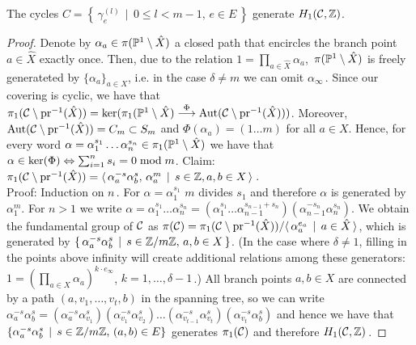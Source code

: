 \documentclass[main.tex]{subfiles}
\begin{document}
  \begin{thm}\label{thm:gen_set}
   The cycles $C = \left\{ \, \gamma_{e}^{(l)} \, \mid \, 0 \le l <m-1, \, e \in E \, \right\}$ generate $\homo$.
  \end{thm}
  \begin{proof}
  Denote by $\alpha_a \in \pi(\P^1 \setminus \hat{X})$ a closed path that encircles the branch point $a \in \hat{X}$ exactly once. Then,  due to the relation $1 = \prod_{a \in \hat{X}} \alpha_a$,\,
  $\pi(\P^1 \setminus \hat{X})$ is freely generateted by $\{ \alpha_a \}_{a \in X}$, i.e. in the case $\delta \ne m$ we can omit $\alpha_{\infty}$\,. \abstand
  Since our covering is cyclic, we have that $
  \pi_1(\cu \setminus \pr^{-1}(\hat{X})) = \ker(\pi_1(\P^1 \setminus \hat{X}) \overset{\Phi}{\To} \Aut(\cu \setminus \pr^{-1}(\hat{X})))$. Moreover, $\Aut(\cu \setminus \pr^{-1}(\hat{X})) = C_m 
  \subset S_m$
  and $\Phi(\alpha_a) = (1 \dots m)$ for all $a \in X$. Hence, for every word $\alpha = \alpha_1^{s_1}\dots \alpha_n^{s_n} \in \pi_1(\P^1 \setminus \hat{X})$ we have that
  $\alpha \in \ker(\Phi) \eq \sum_{i=1}^n s_i = 0 \bmod m$. \abstand
  Claim: $\pi_1(\cu \setminus \pr^{-1}(\hat{X})) = \langle \, \alpha_a^{-s} \alpha_b^{s}, \, \alpha_a^m  \, \mid \, s \in \Z, a,b \in X \, \rangle$\,. \\
  Proof: Induction on $n$\,. For $\alpha = \alpha_1^{s_1}$ $m$ divides $s_1$ and therefore $\alpha$ is generated by $\alpha_1^m$. For $n > 1$ we write
  $\alpha = \alpha_1^{s_1}\dots \alpha_n^{s_n} = (\alpha_1^{s_1} \dots \alpha_{n-1}^{s_{n-1}+s_n})(\alpha_{n-1}^{-s_n}\alpha_n^{s_n})$. \abstand
  We obtain the fundamental group of $\cu$ as
  $\pi(\cu) = \pi_1(\cu \setminus \pr^{-1}(\hat{X})) / \langle \, \alpha_a^{e_a} \, \mid \, a \in \hat{X} \, \rangle$, which is generated by 
  $\{ \, \alpha_a^{-s} \alpha_b^{s} \, \mid \, s \in \Z/m\Z, \, a,b \in X \, \}$. (In the case where $\delta \ne 1$, filling in the points above infinity will create additional relations among 
  these generators:
  $1 = (\prod_{a \in X} \alpha_a)^{k \cdot e_{\infty}}$, $k = 1,\dots,\delta-1$\,.) \abstand
  All branch points $a,b \in X$ are connected by a path $(a,v_1,\dots,v_t,b)$ in the spanning tree, so we can write $\alpha_a^{-s} \alpha_b^{s} = (\alpha_a^{-s}\alpha_{v_1}^{s})
  (\alpha_{v_1}^{-s}\alpha_{v_2}^{s})\dots(\alpha_{v_{t-1}}^{-s}\alpha_{v_t}^{s})(\alpha_{v_t}^{-s}\alpha_b^{s})$ and hence we have that 
  $\{ \alpha_a^{-s} \alpha_b^{s} \, \mid \, s \in \Z/m\Z, \, (a,b) \in E \}$ generates $\pi_1(\cu)$ and therefore $\homo$\,. \abstand

\end{proof}
\end{document}
